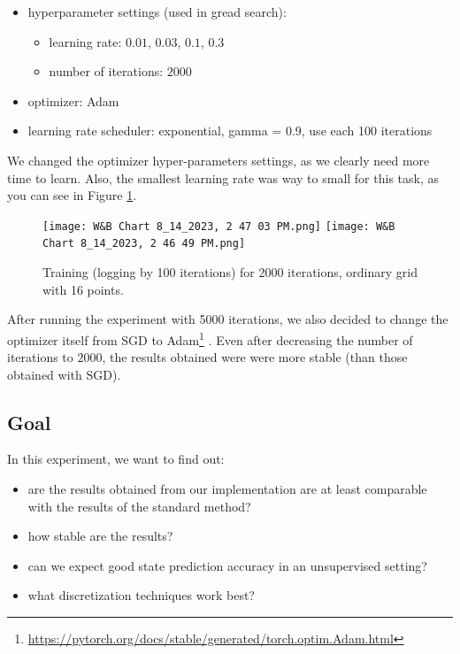 \documentclass[shortabstract]{iithesis}
\begin{document}
\begin{itemize}
    \item hyperparameter settings (used in gread search):
    \begin{itemize}
        \item learning rate: $0.01$, $0.03$, $0.1$, $0.3$
        \item number of iterations: $2000$
    \end{itemize}
    \item optimizer: Adam
    \item learning rate scheduler: exponential, gamma = 0.9, use each 100 iterations
\end{itemize}

We changed the optimizer hyper-parameters settings, as we clearly need more time to learn. Also, the smallest learning rate was way to small for this task, as you can see in Figure \ref{fig:train_prel}.


\begin{figure}[!ht]
    \centering
    \texttt{[image: W\&B Chart 8\_14\_2023, 2 47 03 PM.png]}
    \texttt{[image: W\&B Chart 8\_14\_2023, 2 46 49 PM.png]}
    \caption{Training (logging by 100 iterations) for 2000 iterations, ordinary grid with 16 points.}
    \label{fig:train_prel}
\end{figure}

After running the experiment with 5000 iterations, we also decided to change the optimizer itself from SGD to Adam\footnote{\href{https://pytorch.org/docs/stable/generated/torch.optim.Adam.html}{https://pytorch.org/docs/stable/generated/torch.optim.Adam.html}} \cite{adam}. Even after decreasing the number of iterations to $2000$, the results obtained were were more stable (than those obtained with SGD).

\subsection{Goal}

In this experiment, we want to find out:

\begin{itemize}
    \item are the results obtained from our implementation are at least comparable with the results of the standard method?
    \item how stable are the results?
    \item can we expect good state prediction accuracy in an unsupervised setting?
    \item what discretization techniques work best?
\end{itemize}
\end{document}
